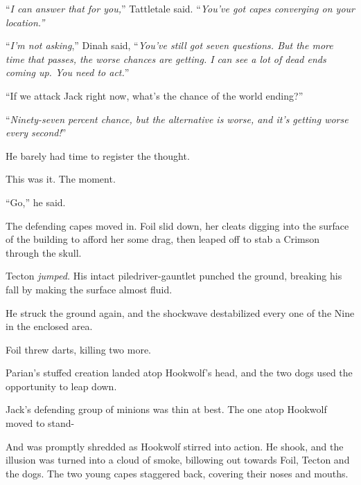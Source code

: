``\emph{I can answer that for you,}'' Tattletale said.  ``\emph{You've got capes converging on your location.''}



``\emph{I'm not asking},'' Dinah said, ``\emph{You've still got seven questions.  But the more time that passes, the worse chances are getting.  I can see a lot of dead ends coming up.  You need to act.}''



``If we attack Jack right now, what's the chance of the world ending?''



``\emph{Ninety-seven percent chance, but the alternative is worse, and it's getting worse every second!}''



He barely had time to register the thought.



This was it.  The moment.



``Go,'' he said.



The defending capes moved in.  Foil slid down, her cleats digging into the surface of the building to afford her some drag, then leaped off to stab a Crimson through the skull.



Tecton \emph{jumped.  }His intact piledriver-gauntlet punched the ground, breaking his fall by making the surface almost fluid.



He struck the ground again, and the shockwave destabilized every one of the Nine in the enclosed area.



Foil threw darts, killing two more.



Parian's stuffed creation landed atop Hookwolf's head, and the two dogs used the opportunity to leap down.



Jack's defending group of minions was thin at best.  The one atop Hookwolf moved to stand-



And was promptly shredded as Hookwolf stirred into action.  He shook, and the illusion was turned into a cloud of smoke, billowing out towards Foil, Tecton and the dogs.  The two young capes staggered back, covering their noses and mouths.



